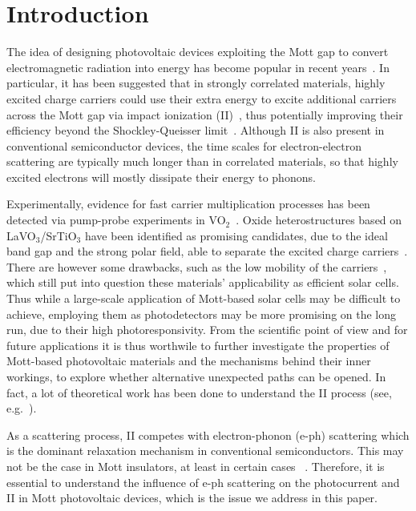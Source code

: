 \documentclass[aps,prb,groupedaddress,showpacs,twocolumn,superscriptaddress,10pt]{revtex4-2}
\begin{document}
\maketitle   
 

\section{Introduction} 
\label{sec:intro}

The idea of designing photovoltaic devices exploiting the Mott gap to convert electromagnetic radiation into energy has become popular in recent years~\cite{mano.10,li.ch.13,gu.gu.13,co.ma.14,wa.li.15}. In particular, it has been suggested that in strongly correlated materials, highly excited charge carriers could use their extra energy to excite additional carriers across the Mott gap via impact ionization (II)~\cite{mano.10,co.ma.14}, thus
potentially improving their efficiency beyond the Shockley-Queisser limit~\cite{sh.qu.61}. Although II is also present in conventional semiconductor devices, the time scales for electron-electron scattering are typically much longer than in correlated materials, so that highly excited electrons will mostly dissipate their energy to phonons. 

Experimentally, evidence for fast carrier multiplication processes has been detected via pump-probe experiments in VO$_2$~\cite{ho.bi.16}. Oxide heterostructures based on LaVO$_3$/SrTiO$_3$ have been identified as promising candidates, due to the ideal band gap and the strong polar field, able to separate the excited charge carriers~\cite{as.bl.13}. There are however some drawbacks, such as the low mobility of the carriers~\cite{wa.li.15,je.re.18}, which still put into question these materials’ applicability as efficient solar cells. Thus while a large-scale application of Mott-based solar cells may be difficult to achieve, employing them as photodetectors may be more promising on the long run, due to their high photoresponsivity. From the scientific point of view and for future applications it is thus worthwile to further investigate the properties of Mott-based photovoltaic materials and the mechanisms behind their inner workings, to explore whether alternative unexpected paths can be opened. In fact, a lot of theoretical work has been done to understand the II process (see, e.g.~\cite{co.ma.14,ec.we.11,ec.we.13,we.he.14,pe.be.19,so.do.18,ka.wo.20,mano.19,ma.ev.22}).

As a scattering process, II competes with electron-phonon (e-ph) scattering which is the dominant relaxation mechanism in conventional semiconductors. This may not be the case in Mott insulators, at least in certain cases ~\cite{co.ma.14}. Therefore, it is essential to understand the influence of e-ph scattering on the photocurrent and II in Mott photovoltaic devices, which is the issue we address in this paper.
\end{document}
